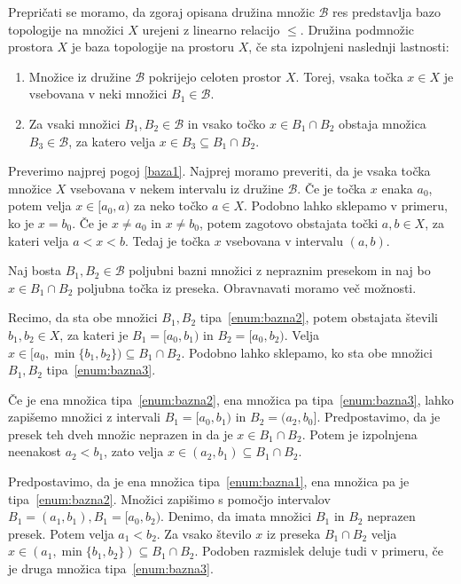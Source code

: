 \documentclass[../TG_magistrsko_delo_sections.tex]{subfiles}
\begin{document}
Prepričati se moramo, da zgoraj opisana družina množic $\mathcal{B}$ res predstavlja bazo topologije na množici $X$ urejeni z linearno relacijo $\leq$. Družina podmnožic prostora $X$ je baza topologije na prostoru $X$, če sta izpolnjeni naslednji lastnosti:
\begin{enumerate}[label={(b\arabic*)}]
\item Množice iz družine $\mathcal{B}$ pokrijejo celoten prostor $X$. Torej, vsaka točka $x \in X$ je vsebovana v neki množici $B_1 \in \mathcal{B}$. \label{baza1}
\item Za vsaki množici $B_1, B_2 \in \mathcal{B}$ in vsako točko $x\in B_1 \cap B_2$ obstaja množica $B_3 \in \mathcal{B}$, za katero velja $x \in B_3 \subseteq B_1 \cap B_2$.\label{baza2}
\end{enumerate}

Preverimo najprej pogoj \ref{baza1}.
Najprej moramo preveriti, da je vsaka točka množice $X$ vsebovana v nekem intervalu iz družine $\mathcal{B}$. Če je točka $x$ enaka $a_0$, potem velja $x \in [a_0, a)$ za neko točko $a \in X$. Podobno lahko sklepamo v primeru, ko je $x = b_0$. Če je $x \neq a_0$ in $x \neq b_0$, potem zagotovo obstajata točki $a, b \in X$, za kateri velja $a < x < b$. Tedaj je točka $x$ vsebovana v intervalu $(a, b)$.

Naj bosta $B_1, B_2 \in \mathcal{B}$ poljubni bazni množici z nepraznim presekom in naj bo $x \in B_1 \cap B_2$ poljubna točka iz preseka. Obravnavati moramo več možnosti. 

Recimo, da sta obe množici $B_1, B_2$ tipa~\ref{enum:bazna2}, potem obstajata števili $b_1, b_2 \in X$, za kateri je $B_1 = [a_0, b_1)$ in $B_2 = [a_0, b_2)$. Velja $x \in [a_0, \min\{b_1, b_2\}) \subseteq B_1 \cap B_2$. Podobno lahko sklepamo, ko sta obe množici $B_1, B_2$ tipa~\ref{enum:bazna3}.

Če je ena množica tipa~\ref{enum:bazna2}, ena množica pa tipa~\ref{enum:bazna3}, lahko zapišemo množici z intervali $B_1 = [a_0, b_1)$ in $B_2 = (a_2, b_0]$. Predpostavimo, da je presek teh dveh množic neprazen in da je $x \in B_1 \cap B_2$. Potem je izpolnjena neenakost $a_2 < b_1$, zato velja $x \in (a_2, b_1) \subseteq B_1 \cap B_2$.

Predpostavimo, da je ena množica tipa~\ref{enum:bazna1}, ena množica pa je tipa~\ref{enum:bazna2}. Množici zapišimo s pomočjo intervalov $B_1 = (a_1, b_1), B_1 = [a_0, b_2)$. Denimo, da imata množici $B_1$ in $B_2$ neprazen presek. Potem velja $a_1 < b_2$. Za vsako število $x$ iz preseka $B_1 \cap B_2$ velja $x \in (a_1, \min\{b_1, b_2\}) \subseteq B_1 \cap B_2$. Podoben razmislek deluje tudi v primeru, če je druga množica tipa~\ref{enum:bazna3}.
\end{document}
